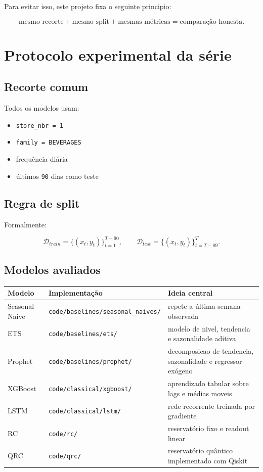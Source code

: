 \documentclass[12pt]{article}
\providecommand{\tightlist}{%
          \setlength{\itemsep}{0pt}\setlength{\parskip}{0pt}}
\begin{document}
Para evitar isso, este projeto fixa o seguinte principio:

\[
\text{mesmo recorte} + \text{mesmo split} + \text{mesmas métricas} = \text{comparação honesta}.
\]

\section{Protocolo experimental da série}\label{3-protocolo-experimental-da-suxe9rie}

\subsection{Recorte comum}\label{31-recorte-comum}

Todos os modelos usam:

\begin{itemize}
\tightlist
\item
  \texttt{store\_nbr\ =\ 1}
\item
  \texttt{family\ =\ BEVERAGES}
\item
  frequência diária
\item
  últimos \texttt{90} dias como teste
\end{itemize}

\subsection{Regra de split}\label{32-regra-de-split}

Formalmente:

\[
\mathcal{D}_{train} = \{(x_t, y_t)\}_{t=1}^{T-90},
\qquad
\mathcal{D}_{test} = \{(x_t, y_t)\}_{t=T-89}^T.
\]

\subsection{Modelos avaliados}\label{33-modelos-avaliados}

\begin{longtable}[]{@{}lll@{}}
\toprule\noalign{}
Modelo & Implementação & Ideia central \\
\midrule\noalign{}
\endhead
\bottomrule\noalign{}
\endlastfoot
Seasonal Naive & \texttt{code/baselines/seasonal\_naives/} & repete a última semana observada \\
ETS & \texttt{code/baselines/ets/} & modelo de nivel, tendencia e sazonalidade aditiva \\
Prophet & \texttt{code/baselines/prophet/} & decomposicao de tendencia, sazonalidade e regressor exógeno \\
XGBoost & \texttt{code/classical/xgboost/} & aprendizado tabular sobre lags e médias moveis \\
LSTM & \texttt{code/classical/lstm/} & rede recorrente treinada por gradiente \\
RC & \texttt{code/rc/} & reservatório fixo e readout linear \\
QRC & \texttt{code/qrc/} & reservatório quântico implementado com Qiskit \\
\end{longtable}
\end{document}

